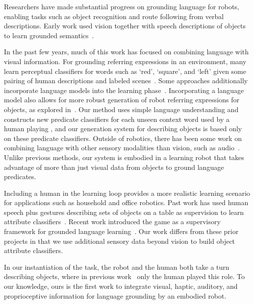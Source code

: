 Researchers have made substantial progress on grounding language for robots, enabling tasks such as object recognition and route following from verbal descriptions.
Early work used vision together with speech descriptions of objects to learn grounded semantics~\cite{roy:cogsci02}.

In the past few years, much of this work has focused on combining language with visual information.
For grounding referring expressions in an environment, many learn perceptual classifiers for words such as `red', `square', and `left' given some pairing of human descriptions and labeled scenes~\cite{liu:acl14,malinowski:nips14,mohan:acs13,sun:icra13,dindo:iros10,vogel:aaai10}.
Some approaches additionally incorporate language models into the learning phase~\cite{spranger:ijcai15,krishnamurthy:acl13,perera:aaai13,matuszek:icml12}.
Incorporating a language model also allows for more robust generation of robot referring expressions for objects, as explored in~\cite{tellex:rss14}.
Our method uses simple language understanding and constructs new predicate classifiers for each unseen context word used by a human playing \ispy, and our generation system for describing objects is based only on these predicate classifiers.
Outside of robotics, there has been some work on combining language with other sensory modalities than vision, such as audio~\cite{kiela:emnlp15}.
Unlike previous methods, our system is embodied in a learning robot that takes advantage of more than just visual data from objects to ground language predicates.

Including a human in the learning loop provides a more realistic learning scenario for applications such as household and office robotics.
Past work has used human speech plus gestures describing sets of objects on a table as supervision to learn attribute classifiers~\cite{matuszek:aaai14,kollar:rss13}. Recent work introduced the \ispy game as a supervisory framework for grounded language learning~\cite{parde:ijcai15}.
Our work differs from these prior projects in that we use additional sensory data beyond vision to build object attribute classifiers.

In our instantiation of the \ispy task, the robot and the human both take a turn describing objects, where in previous work~\cite{parde:ijcai15} only the human played this role.
To our knowledge, ours is the first work to integrate visual, haptic, auditory, and proprioceptive information for language grounding by an embodied robot.

